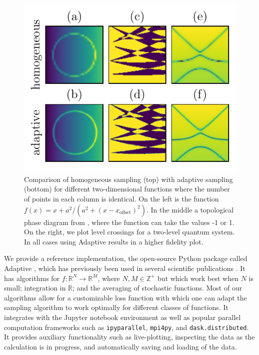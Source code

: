 \begin{figure}
\centering
\includegraphics{chapter_adaptive/figures/Learner2D.pdf}
\caption{Comparison of homogeneous sampling (top) with adaptive sampling (bottom) for different two-dimensional functions where the number of points in each column is identical.
On the left is the function $f(x) = x + a ^ 2 / (a ^ 2 + (x - x_\textrm{offset}) ^ 2)$.
In the middle a topological phase diagram from \cite{Nijholt2016}, where the function can take the values -1 or 1.
On the right, we plot level crossings for a two-level quantum system.
In all cases using Adaptive results in a higher fidelity plot.\label{fig:Learner2D}}
\end{figure}


We provide a reference implementation, the open-source Python package called Adaptive \cite{Nijholt2019a}, which has previously been used in several scientific publications \cite{Vuik2018, Laeven2019, Bommer2019, Melo2019}.
It has algorithms for $f \colon \mathbb{R}^N \to \mathbb{R}^M$, where $N, M \in \mathbb{Z}^+$ but which work best when $N$ is small; integration in $\mathbb{R}$; and the averaging of stochastic functions.
Most of our algorithms allow for a customizable loss function with which one can adapt the sampling algorithm to work optimally for different classes of functions.
It integrates with the Jupyter notebook environment as well as popular parallel computation frameworks such as \passthrough{\lstinline!ipyparallel!}, \passthrough{\lstinline!mpi4py!}, and \passthrough{\lstinline!dask.distributed!}.
It provides auxiliary functionality such as live-plotting, inspecting the data as the calculation is in progress, and automatically saving and loading of the data.

